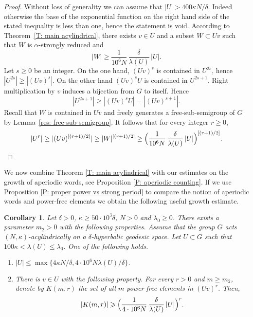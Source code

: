 \documentclass[11pt]{article}
\theoremstyle{plain}
\newtheorem{cor}[thm]{Corollary}
\theoremstyle{definition}
\begin{document}
\begin{proof}
Without loss of generality we can assume that $|U| > 400\kappa N /\delta$.
Indeed otherwise the base of the exponential function on the right hand side of the stated inequality is less than one, hence the statement is void.
According to Theorem~\ref{T: main acylindrical}, there exists $v \in U$ and a subset $W \subset Uv$ such that $W$ is $\alpha$-strongly reduced and
\begin{equation*}
|W| \geq \frac 1{10^6N}\,\frac \delta{\lambda(U)}\, |U|.
\end{equation*}
Let $s \geq 0$ be an integer.
On the one hand, $(Uv)^s$ is contained in $U^{2s}$, hence $|U^{2s}| \geq |(Uv)^s|$.
On the other hand $(Uv)^sU$ is contained in $U^{2s+1}$.
Right multiplication by $v$ induces a bijection from $G$ to itself.
Hence
\begin{equation*}
|U^{2s+1}| \geq |(Uv)^sU| = |(Uv)^{s+1}|.
\end{equation*}
Recall that $W$ is contained in $Uv$ and freely generates a free-sub-semigroup of $G$ by Lemma~\ref{res: free-sub-semigroup}.
It follows that for every integer $r \geq 0$,
\begin{equation*}
|U^r| \geq |(Uv)^{[(r+1)/2]}| \geq |W|^{[(r+1)/2]} \geq \Bigl( \frac 1{10^6N}\,\frac \delta{\lambda(U)}\, |U| \Bigr)^{[(r+1)/2]}.\qedhere
\end{equation*}
\end{proof}

We now combine Theorem \ref{T: main acylindrical} with our estimates on the growth of aperiodic words, see Proposition \ref{P: aperiodic counting}. If we use Proposition \ref{P: proper power vs strong period} to compare the notion of aperiodic words and power-free elements we obtain the following useful growth estimate.

\begin{cor}\label{T: main acylindrical power free}
Let $\delta >0$, $\kappa\geqslant 50\cdot 10^3\delta$, $N>0$ and $\lambda_0 \geq 0$.
There exists a parameter $m_2 > 0$ with the following properties.
Assume that the group $G$ acts $(N,\kappa)$-acylindrically on a $\delta$-hyperbolic geodesic space.
Let $U\subset G$ such that \hbox{$100\kappa \!<\!\lambda(U) \!\leq\! \lambda_0$}.
One of the following holds.
\begin{enumerate}
\item $\displaystyle |U| \leq \max\{4\kappa N/\delta, 4\cdot 10^6 N \lambda(U)/\delta\}$.
\item There is $v \in U$ with the following property.
For every $r > 0$ and $m \geq m_2$, denote by $K(m,r)$ the set of all $m$-power-free elements in $(Uv)^r$.
Then,
\[
|K(m,r)| \geqslant \Bigl( \frac{1}{4\cdot 10^6 N}\,\frac{\delta}{\lambda(U)}\, |U|\Bigr)^{r}. 
\]
\end{enumerate}

\end{cor}
\end{document}
